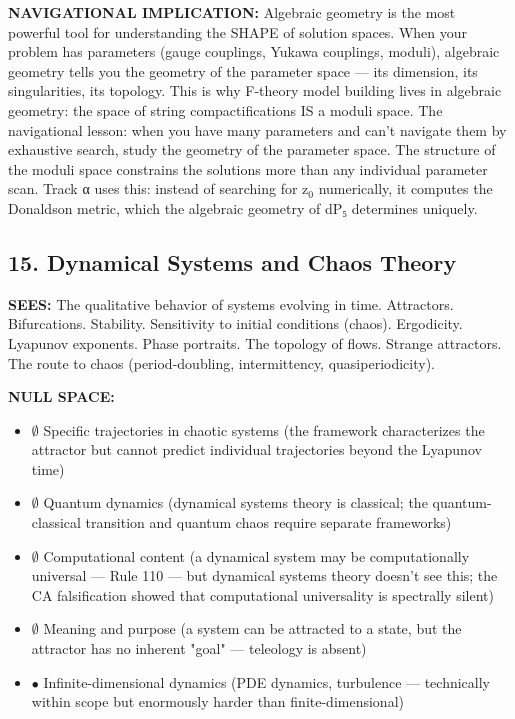 \textbf{NAVIGATIONAL IMPLICATION:} Algebraic geometry is the most powerful tool for understanding the SHAPE of solution spaces. When your problem has parameters (gauge couplings, Yukawa couplings, moduli), algebraic geometry tells you the geometry of the parameter space — its dimension, its singularities, its topology. This is why F-theory model building lives in algebraic geometry: the space of string compactifications IS a moduli space. The navigational lesson: when you have many parameters and can't navigate them by exhaustive search, study the geometry of the parameter space. The structure of the moduli space constrains the solutions more than any individual parameter scan. Track α uses this: instead of searching for z$_0$ numerically, it computes the Donaldson metric, which the algebraic geometry of dP₅ determines uniquely.


\bigskip\noindent\makebox[\textwidth]{\color{rulegray}\rule{5cm}{0.3pt}}\bigskip


\subsection*{15. Dynamical Systems and Chaos Theory}


\textbf{SEES:} The qualitative behavior of systems evolving in time. Attractors. Bifurcations. Stability. Sensitivity to initial conditions (chaos). Ergodicity. Lyapunov exponents. Phase portraits. The topology of flows. Strange attractors. The route to chaos (period-doubling, intermittency, quasiperiodicity).


\textbf{NULL SPACE:}

\begin{itemize}[nosep,leftmargin=*]
  \item $\emptyset$ Specific trajectories in chaotic systems (the framework characterizes the attractor but cannot predict individual trajectories beyond the Lyapunov time)
  \item $\emptyset$ Quantum dynamics (dynamical systems theory is classical; the quantum-classical transition and quantum chaos require separate frameworks)
  \item $\emptyset$ Computational content (a dynamical system may be computationally universal — Rule 110 — but dynamical systems theory doesn't see this; the CA falsification showed that computational universality is spectrally silent)
  \item $\emptyset$ Meaning and purpose (a system can be attracted to a state, but the attractor has no inherent "goal" — teleology is absent)
  \item $\bullet$ Infinite-dimensional dynamics (PDE dynamics, turbulence — technically within scope but enormously harder than finite-dimensional)
\end{itemize}


